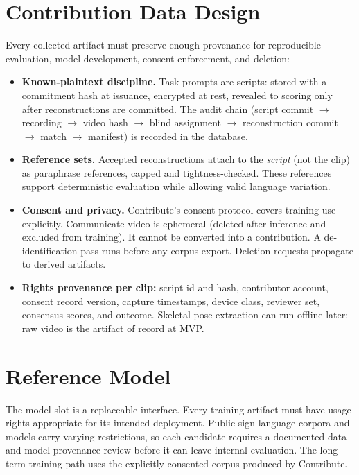 \documentclass[11pt]{article}
\begin{document}
\section{Contribution Data Design}

Every collected artifact must preserve enough provenance for reproducible
evaluation, model development, consent enforcement, and deletion:

\begin{itemize}[nosep]
  \item \textbf{Known-plaintext discipline.} Task prompts are scripts: stored with a
        commitment hash at issuance, encrypted at rest, revealed to scoring only
        after reconstructions are committed. The audit chain (script commit $\to$
        recording $\to$ video hash $\to$ blind assignment $\to$ reconstruction
        commit $\to$ match $\to$ manifest) is recorded in the database.
  \item \textbf{Reference sets.} Accepted reconstructions attach to the
        \emph{script} (not the clip) as paraphrase references, capped and
        tightness-checked. These references support deterministic evaluation while
        allowing valid language variation.
  \item \textbf{Consent and privacy.} Contribute's consent protocol
        covers training use explicitly. Communicate video is ephemeral (deleted
        after inference and excluded from training). It cannot be converted into a
        contribution. A de-identification pass runs before any corpus export.
        Deletion requests propagate to derived artifacts.
  \item \textbf{Rights provenance per clip:} script id and hash, contributor
        account, consent record version, capture timestamps, device class, reviewer
        set, consensus scores, and outcome. Skeletal pose extraction can run offline
        later; raw video is the artifact of record at MVP.
\end{itemize}

\section{Reference Model}
\label{sec:model}

The model slot is a replaceable interface. Every training artifact must have usage
rights appropriate for its intended deployment. Public sign-language corpora and
models carry varying restrictions, so each candidate requires a documented data and
model provenance review before it can leave internal evaluation. The long-term
training path uses the explicitly consented corpus produced by Contribute.
\end{document}
